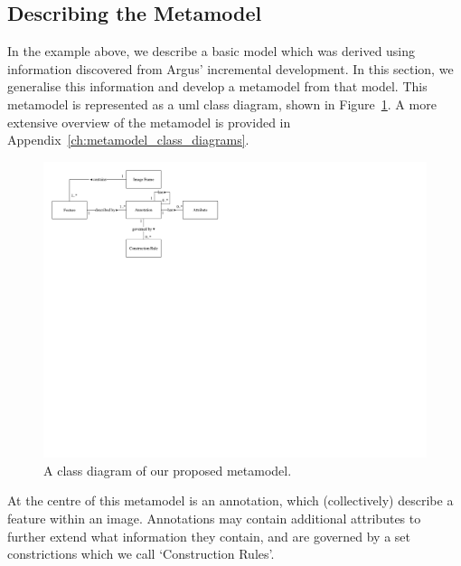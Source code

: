\subsection{Describing the Metamodel}
\label{sec:dataset:architecture:metamodel}


In the example above, we describe a basic model which was derived using information discovered from Argus' incremental development. In this section, we generalise this information and develop a metamodel from that model. This metamodel is represented as a \gls{uml} class diagram, shown in Figure~\ref{fig:dataset:metamodel_class_diagram}. A more extensive overview of the metamodel is provided in Appendix~\ref{ch:metamodel_class_diagrams}.

\begin{figure}[h]
  \centering
  \includegraphics[width=\textwidth]{images/dataset/metamodel_class_diagram}
  \caption[Class diagram of our proposed metamodel]{A class diagram of our proposed metamodel.}
  \label{fig:dataset:metamodel_class_diagram}
\end{figure}

At the centre of this metamodel is an annotation, which (collectively) describe a feature within an image. Annotations may contain additional attributes to further extend what information they contain, and are governed by a set constrictions which we call `Construction Rules'.

